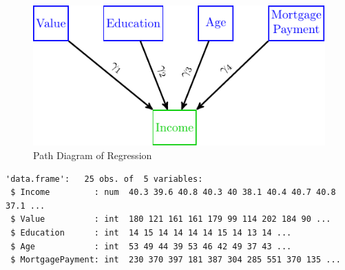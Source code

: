 \begin{figure}[H]

{\centering \includegraphics[width=0.8\linewidth]{images/Reg1} 

}

\caption{Path Diagram of Regression}\label{fig:Reg1}
\end{figure}

\begin{Shaded}
\begin{Highlighting}[]
\NormalTok{(}\NormalTok{)}
\end{Highlighting}
\end{Shaded}

\begin{verbatim}
'data.frame':   25 obs. of  5 variables:
 $ Income         : num  40.3 39.6 40.8 40.3 40 38.1 40.4 40.7 40.8 37.1 ...
 $ Value          : int  180 121 161 161 179 99 114 202 184 90 ...
 $ Education      : int  14 15 14 14 14 14 15 14 13 14 ...
 $ Age            : int  53 49 44 39 53 46 42 49 37 43 ...
 $ MortgagePayment: int  230 370 397 181 387 304 285 551 370 135 ...
\end{verbatim}

\begin{Shaded}
\begin{Highlighting}[]
\StringTok{  }\NormalTok{(}
      \OperatorTok{~}\StringTok{ }\OperatorTok{+}\StringTok{ }\OperatorTok{+}\StringTok{ }\OperatorTok{+}
\StringTok{                            }
\NormalTok{    , }
\NormalTok{    , } 
\NormalTok{    , } 
\NormalTok{    , } 
\NormalTok{    , } 
\NormalTok{    , } 
\NormalTok{    , } 
\NormalTok{    , } 
\NormalTok{  )}

\end{Highlighting}
\end{Shaded}

